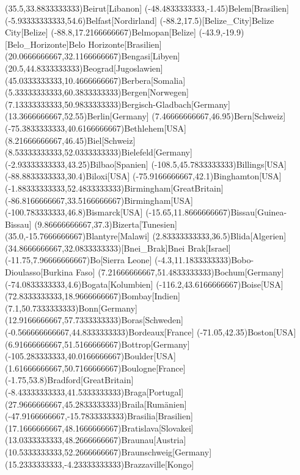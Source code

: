 \mapput(35.5,33.8833333333){Beirut}[Libanon]
\mapput(-48.4833333333,-1.45){Belem}[Brasilien]
\mapput(-5.93333333333,54.6){Belfast}[Nordirland]
\mapput(-88.2,17.5)[Belize_City]{Belize City}[Belize]
\mapput(-88.8,17.2166666667){Belmopan}[Belize]
\mapput(-43.9,-19.9)[Belo_Horizonte]{Belo Horizonte}[Brasilien]
\mapput(20.0666666667,32.1166666667){Bengasi}[Libyen]
\mapput(20.5,44.8333333333){Beograd}[Jugoslawien]
\mapput(45.0333333333,10.4666666667){Berbera}[Somalia]
\mapput(5.33333333333,60.3833333333){Bergen}[Norwegen]
\mapput(7.13333333333,50.9833333333){Bergisch-Gladbach}[Germany]
\mapput(13.3666666667,52.55){Berlin}[Germany]
\mapput(7.46666666667,46.95){Bern}[Schweiz]
\mapput(-75.3833333333,40.6166666667){Bethlehem}[USA]
\mapput(8.21666666667,46.45){Biel}[Schweiz]
\mapput(8.53333333333,52.0333333333){Bielefeld}[Germany]
\mapput(-2.93333333333,43.25){Bilbao}[Spanien]
\mapput(-108.5,45.7833333333){Billings}[USA]
\mapput(-88.8833333333,30.4){Biloxi}[USA]
\mapput(-75.9166666667,42.1){Binghamton}[USA]
\mapput(-1.88333333333,52.4833333333){Birmingham}[GreatBritain]
\mapput(-86.8166666667,33.5166666667){Birmingham}[USA]
\mapput(-100.783333333,46.8){Bismarck}[USA]
\mapput(-15.65,11.8666666667){Bissau}[Guinea-Bissau]
\mapput(9.86666666667,37.3){Bizerta}[Tunesien]
\mapput(35.0,-15.7666666667){Blantyre}[Malawi]
\mapput(2.83333333333,36.5){Blida}[Algerien]
\mapput(34.8666666667,32.0833333333)[Bnei_Brak]{Bnei Brak}[Israel]
\mapput(-11.75,7.96666666667){Bo}[Sierra Leone]
\mapput(-4.3,11.1833333333){Bobo-Dioulasso}[Burkina Faso]
\mapput(7.21666666667,51.4833333333){Bochum}[Germany]
\mapput(-74.0833333333,4.6){Bogata}[Kolumbien]
\mapput(-116.2,43.6166666667){Boise}[USA]
\mapput(72.8333333333,18.9666666667){Bombay}[Indien]
\mapput(7.1,50.7333333333){Bonn}[Germany]
\mapput(12.9166666667,57.7333333333){Boras}[Schweden]
\mapput(-0.566666666667,44.8333333333){Bordeaux}[France]
\mapput(-71.05,42.35){Boston}[USA]
\mapput(6.91666666667,51.5166666667){Bottrop}[Germany]
\mapput(-105.283333333,40.0166666667){Boulder}[USA]
\mapput(1.61666666667,50.7166666667){Boulogne}[France]
\mapput(-1.75,53.8){Bradford}[GreatBritain]
\mapput(-8.43333333333,41.5333333333){Braga}[Portugal]
\mapput(27.9666666667,45.2833333333){Braila}[Rumänien]
\mapput(-47.9166666667,-15.7833333333){Brasilia}[Brasilien]
\mapput(17.1666666667,48.1666666667){Bratislava}[Slovakei]
\mapput(13.0333333333,48.2666666667){Braunau}[Austria]
\mapput(10.5333333333,52.2666666667){Braunschweig}[Germany]
\mapput(15.2333333333,-4.23333333333){Brazzaville}[Kongo]
